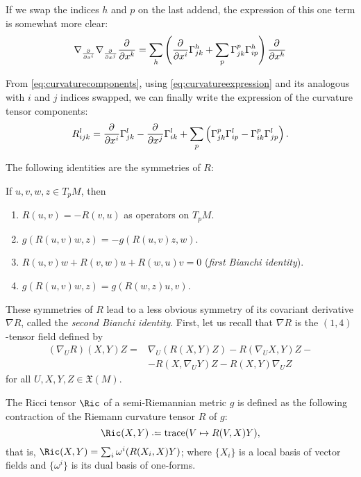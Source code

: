 If we swap the indices $h$ and $p$ on the last addend, the expression of this one term is somewhat more clear:
\begin{equation}
\label{eq:curvatureexpression}
\nabla_{\frac{\partial^{} }{\partial x^i}}\nabla_{\frac{\partial^{} }{\partial x^j}} \frac{\partial^{} }{\partial x^k} = \sum_h\left( \frac{\partial^{} }{\partial x^i} \Gamma^h_{jk} + \sum_p \Gamma^p_{jk} \Gamma^h_{ip} \right) \frac{\partial^{} }{\partial x^h}
\end{equation}

From \autoref{eq:curvaturecomponents}, using \autoref{eq:curvatureexpression} and its analogous with $i$ and $j$ indices swapped, we can finally write the expression of the curvature tensor components:
\[
R^l_{ijk} = \frac{\partial^{} }{\partial x^i} \Gamma^l_{jk} - \frac{\partial^{} }{\partial x^j} \Gamma^l_{ik} + \sum_p \left( \Gamma^p_{jk} \Gamma^l_{ip} - \Gamma^p_{ik} \Gamma^l_{jp} \right).
\]

The following identities are the symmetries of $R$:

\begin{proposition}
	If $u,v,w,z \in T_p M$, then
	\begin{enumerate}
		\item $R(u,v) = -R(v,u)$ as operators on $T_p M$.
		\item $g(R(u,v)w, z) = -g(R(u,v)z, w)$.
		\item $R(u,v)w +R(v,w)u + R(w,u)v = 0$ (\emph{first Bianchi identity}).
		\item $g(R(u,v)w,z)  = g(R(w,z)u, v)$.
	\end{enumerate}
\end{proposition}

These symmetries of $R$ lead to a less obvious symmetry of its covariant derivative $\nabla R$, called the \emph{second Bianchi identity}. First, let us recall that $\nabla R$ is the $(1,4)$-tensor field defined by
\begin{align*}
	\left( \nabla_U R \right)(X,Y)Z = &\nabla_U(R(X,Y)Z) - R(\nabla_U X, Y)Z - \\
	&-R(X, \nabla_U Y)Z - R(X,Y) \nabla_U Z
\end{align*}
for all $U,X,Y,Z \in \mathfrak{X}(M)$.

\begin{definition}
	The Ricci tensor $\Ric$ of a semi-Riemannian metric $g$ is defined as the following contraction of the Riemann curvature tensor $R$ of $g$:
	\[
		\Ric(X,Y) \defeq \operatorname{trace}(V \mapsto R(V, X)Y ),
	\]
	that is, $\Ric(X,Y) =  \sum_i \omega^i (R(X_i, X)Y)$; where $\{X_i\}$ is a local basis of vector fields and $\{\omega^i\}$ is its dual basis of one-forms.
\end{definition}

